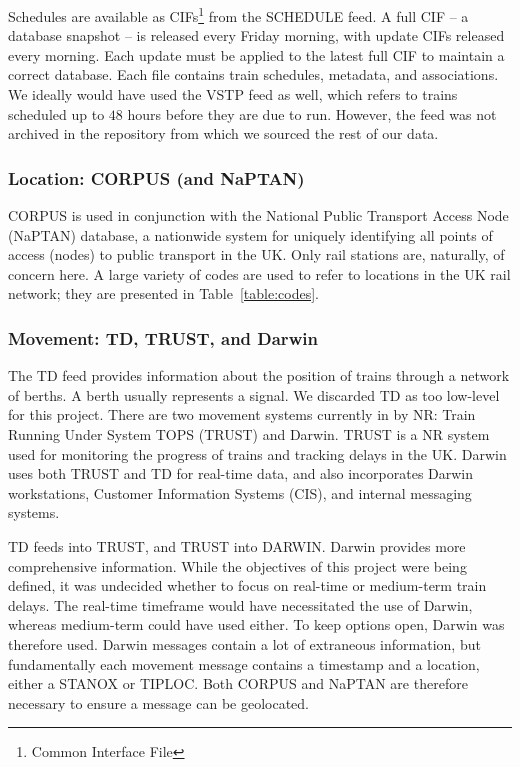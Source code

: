 \documentclass[12pt,a4paper]{article}
\begin{document}
Schedules are available as CIFs\footnote{Common Interface File} from the SCHEDULE feed. A full CIF – a database snapshot – is released every Friday morning, with update CIFs released every morning. Each update must be applied to the latest full CIF to maintain a correct database. Each file contains train schedules, metadata, and associations. We ideally would have used the VSTP feed as well, which refers to trains scheduled up to $48$ hours before they are due to run. However, the feed was not archived in the repository from which we sourced the rest of our data.

\subsubsection{Location: CORPUS (and NaPTAN)}

CORPUS is used in conjunction with the National Public Transport Access Node (NaPTAN) database, a nationwide system for uniquely identifying all points of access (nodes) to public transport in the UK. Only rail stations are, naturally, of concern here. A large variety of codes are used to refer to locations in the UK rail network; they are presented in Table~\ref{table:codes}.

\subsubsection{Movement: TD, TRUST, and Darwin}

The TD feed provides information about the position of trains through a network of berths. A berth usually represents a signal. We discarded TD as too low-level for this project. There are two movement systems currently in by NR: Train Running Under System TOPS (TRUST) and Darwin. TRUST is a NR system used for monitoring the progress of trains and tracking delays in the UK. Darwin uses both TRUST and TD for real-time data, and also incorporates Darwin workstations, Customer Information Systems (CIS), and internal messaging systems.

TD feeds into TRUST, and TRUST into DARWIN. Darwin provides more comprehensive information. While the objectives of this project were being defined, it was undecided whether to focus on real-time or medium-term train delays. The real-time timeframe would have necessitated the use of Darwin, whereas medium-term could have used either. To keep options open, Darwin was therefore used. Darwin messages contain a lot of extraneous information, but fundamentally each movement message contains a timestamp and a location, either a STANOX or TIPLOC. Both CORPUS and NaPTAN are therefore necessary to ensure a message can be geolocated.
\end{document}
